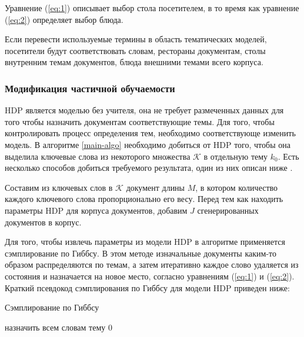 \documentclass[12pt, a4paper]{article}
\begin{document}
  Уравнение (\ref{eq:1}) описывает выбор стола посетителем, в то время как уравнение (\ref{eq:2}) определяет выбор блюда.
  
  Если перевести используемые термины в область тематических моделей, посетители будут соответствовать словам, рестораны документам, столы внутренним темам документов, блюда внешними темами всего корпуса\cite{hdp-1}.
  
  \subsubsection{Модификация частичной обучаемости}
  HDP является моделью без учителя, она не требует размеченных данных для того чтобы назначить документам соответствующие темы. Для того, чтобы контролировать процесс определения тем, необходимо соответствующе изменить модель. В алгоритме \ref{main-algo} необходимо добиться от HDP того, чтобы она выделила ключевые слова из некоторого множества $\mathcal{K}$ в отдельную тему $k_0$. Есть несколько способов добиться требуемого результата, один из них описан ниже \cite{ss-learning}.
  
	Составим из ключевых слов в $\mathcal{K}$ документ длины $M$, в котором количество каждого ключевого слова пропорционально его весу. Перед тем как находить параметры HDP для корпуса документов, добавим $J$ сгенерированных документов в корпус. 
	
  Для того, чтобы извлечь параметры из модели HDP в алгоритме применяется сэмплирование по Гиббсу. В этом методе изначальные документы каким-то образом распределяются по темам, а затем итеративно каждое слово удаляется из состояния и назначается на новое место, согласно уравнениям (\ref{eq:1}) и (\ref{eq:2}). Краткий псевдокод сэмплирования по Гиббсу для модели HDP приведен ниже:
  
  \begin{algorithm}[H]
  	\caption{Сэмплирование по Гиббсу}
    \SetAlgoLined
  	назначить всем словам тему $0$\;
  \end{algorithm}
  
\end{document}
